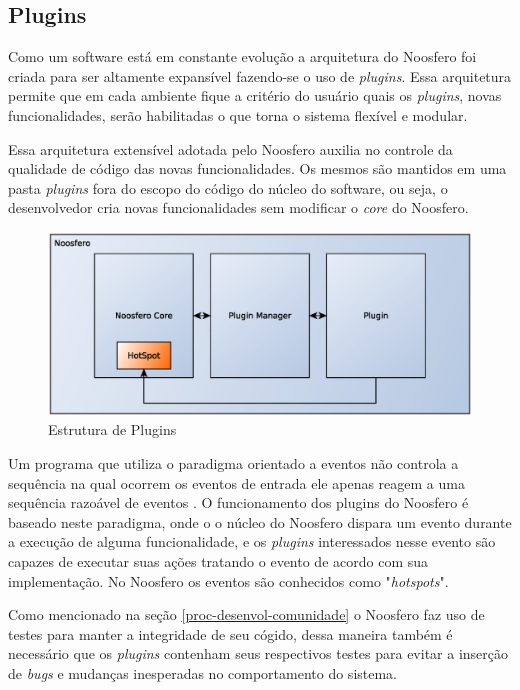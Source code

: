 \subsection{Plugins}

Como um software está em constante evolução a arquitetura do Noosfero foi criada para ser altamente expansível fazendo-se o uso de \textit{plugins}. Essa arquitetura permite que em cada ambiente fique a critério do usuário quais os \textit{plugins}, novas funcionalidades, serão habilitadas o que torna o sistema flexível e modular.

Essa arquitetura extensível adotada pelo Noosfero auxilia no controle da qualidade de código das novas funcionalidades. Os mesmos são mantidos em uma pasta \textit{plugins} fora do escopo do código  do núcleo do software, ou seja, o desenvolvedor cria novas funcionalidades sem modificar o \textit{core} do Noosfero.

\begin{figure}[h]
    \centering
    \includegraphics[keepaspectratio=true,scale=0.4]
      {figuras/estruturaDePlugins.eps}
    \caption{Estrutura de Plugins}
    \label{issue-tracker}
\end{figure}


Um programa que utiliza o paradigma orientado a eventos não controla a sequência na qual ocorrem os eventos de entrada ele apenas reagem a uma sequência razoável de eventos \cite{tucker2009linguagens}. O funcionamento dos plugins do Noosfero é baseado neste paradigma, onde o o núcleo do Noosfero dispara um evento durante a execução de alguma funcionalidade, e os \textit{plugins} interessados nesse evento são capazes de executar suas ações tratando o evento de acordo com sua implementação. No Noosfero os eventos são conhecidos como "\textit{hotspots}".

Como mencionado na seção \ref{proc-desenvol-comunidade} o Noosfero faz uso de testes para manter a integridade de seu cógido, dessa maneira também é necessário que os \textit{plugins} contenham seus respectivos testes para evitar a inserção de \textit{bugs} e mudanças inesperadas no comportamento do sistema.

